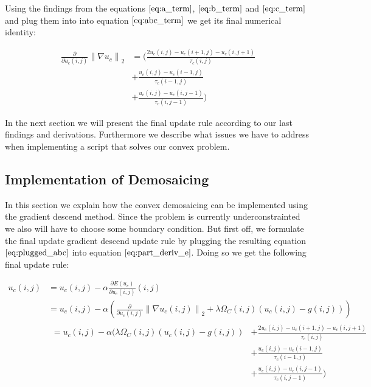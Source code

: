 \documentclass{paper}
\newcommand{\norm}[1]{\left\lVert#1\right\rVert}
\begin{document}
Using the findings from the equations $\ref{eq:a_term}$, $\ref{eq:b_term}$ and $\ref{eq:c_term}$ and plug them into into equation $\ref{eq:abc_term}$ we get its final numerical identity:

\begin{align}
\frac{\partial}{\partial u_{c}\left(i,j\right)} \norm{\nabla{u_c}}_2 
&= \Bigg(\frac{2 u_{c} \left(i,j\right) - u_{c} \left(i+1,j\right)-u_{c} \left(i,j+1\right)}{\tau_{c}\left(i,j\right)} \nonumber \\ 
&+ \frac{u_{c}\left(i,j\right) - u_{c}\left(i-1,j\right)}{\tau_{c}\left(i-1,j\right)} \nonumber \\
&+ \frac{u_{c}(i,j)-u_{c} \left(i,j-1\right)}{\tau_{c}\left(i,j-1\right)}\Bigg)
\label{eq:plugged_abc}	
\end{align}

In the next section we will present the final update rule according to our last findings and derivations. Furthermore we describe what issues we have to address when implementing a script that solves our convex problem.

\subsection{Implementation of Demosaicing}

In this section we explain how the convex demosaicing can be implemented using the gradient descend method. Since the problem is currently underconstrainted we also will have to choose some boundary condition. But first off, we formulate the final update gradient descend update rule by plugging the resulting equation $\ref{eq:plugged_abc}$ into equation $\ref{eq:part_deriv_e}$. Doing so we get the following final update rule:

\begin{align}
	u_{c} (i,j)
	&= u_{c}(i,j) - \alpha \frac{\partial{E(u_c)}}{\partial{u_{c} (i,j)}}(i,j) \nonumber \\
	&= u_{c}(i,j) - \alpha \left( \frac{\partial}{\partial{u_{c} (i,j)}} \norm{\nabla u_{c}(i,j)}_2 + \lambda \Omega_{C}(i,j) \left( u_{c}(i,j) - g(i,j) \right) \right) \nonumber \\
&\begin{aligned}
  =u_{c}(i,j) - \alpha \Bigg( \lambda \Omega_{C}(i,j) \left( u_{c}(i,j) - g(i,j) \right) &+ \frac{2 u_{c} \left(i,j\right) - u_{c} \left(i+1,j\right)-u_{c} \left(i,j+1\right)}{\tau_{c}\left(i,j\right)} \\
  &+ \frac{u_{c}\left(i,j\right) - u_{c}\left(i-1,j\right)}{\tau_{c}\left(i-1,j\right)} \\ 
  &+ \frac{u_{c}(i,j)-u_{c} \left(i,j-1\right)}{\tau_{c}\left(i,j-1\right)}\Bigg) \\
\end{aligned}
\label{eq:final_update_rule}
\end{align}
\end{document}
